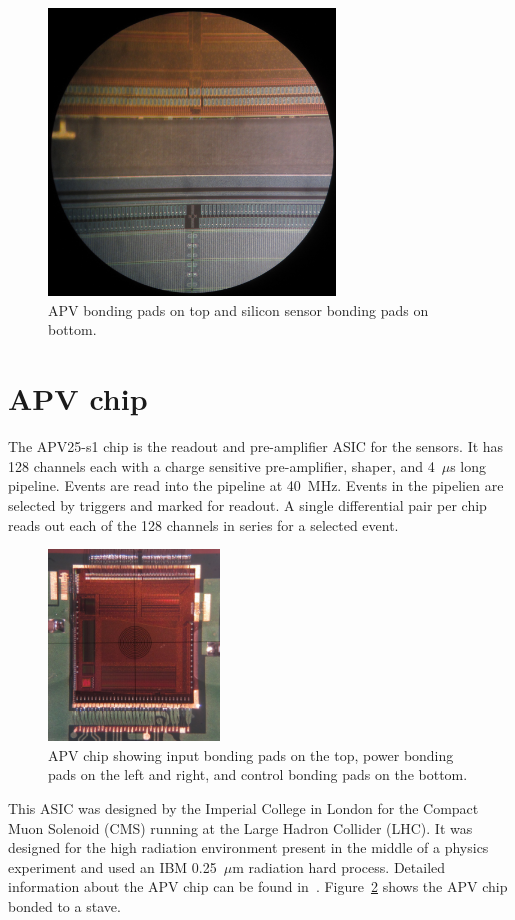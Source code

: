 \documentclass[preprint,12pt]{elsarticle}
\begin{document}
\begin{figure}[ht]
\begin{center}
\includegraphics[width=3in, keepaspectratio=true, angle=0]{graphics/bonding_pads.jpg}
\caption{APV bonding pads on top and silicon sensor bonding pads on bottom.
\label{fig:bonding_pads}}
\end{center}
\end{figure}
%
\section{APV chip}
The APV25-s1 chip is the readout and pre-amplifier ASIC for the sensors. It has
128 channels each with a charge sensitive pre-amplifier, shaper, and 4~$\mu$s long
pipeline. Events are read into the pipeline at 40~MHz. Events in the pipelien are selected by
triggers and marked for readout. A single differential pair per chip reads out each of
the 128 channels in series for a selected event.

\begin{figure}[ht]
\begin{center}
\includegraphics[height=2in, keepaspectratio=true, angle=0]{graphics/apv_chip.jpg}
\caption{APV chip showing input bonding pads on the top, power bonding pads on
the left and right, and control bonding pads on the bottom.
\label{fig:apv}}
\end{center}
\end{figure}
%
This ASIC was designed by the Imperial College in London for the Compact Muon
Solenoid (CMS) running at the Large Hadron Collider (LHC). It was designed
for the high radiation environment present in the middle of a physics experiment
and used an IBM 0.25~$\mu$m radiation hard process. Detailed information about the
APV chip can be found in~\cite{ref:apv}.  Figure~\ref{fig:apv} shows the APV 
chip bonded to a stave.
\end{document}
